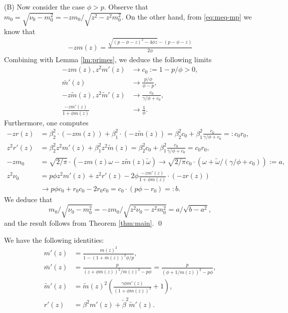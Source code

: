 (B) Now consider the case $\phi>p$. Observe that $m_0 = \sqrt{\nu_0-m_0^2}=-zm_0/\sqrt{z^2-z^2m_0^2}$. On the other hand, from \eqref{eq:meq-mp} we know that
\begin{eqnarray}
    -zm(z) = \frac{\sqrt{(p-\phi-z)^2-4\phi z}-(p-\phi-z)}{2\phi}
\end{eqnarray}
Combining with Lemma \ref{lm:primes}, we deduce the following limits
\begin{align*}
-zm(z),z^2m'(z) &\to c_0:=1-p/\phi>0,\\
\bar m'(z) &\to \frac{p/\phi}{\phi-p},\\
-z\tilde m(z), z^2\tilde m'(z) &\to \frac{c_0}{\gamma/\phi+c_0},\\
\frac{-z m'(z)}{1+\phi m(z)} &\to \frac{1}{\phi}.
\end{align*}
Furthermore, one computes
\begin{align*}
-zr(z) &= \beta_2^2\cdot (-z m(z)) + \beta_1^2\cdot (-z \tilde m(z)) = \beta_2^2c_0 + \beta_1^2 \frac{c_0}{\gamma/\phi+c_0}=:c_0r_0,\\
z^2 r'(z) &= \beta_2^2 z^2m'(z) + \beta_1^2 z^2\tilde m(z) = \beta_2^2 c_0 + \beta_1^2 \frac{c_0}{\gamma/\phi+c_0}=c_0r_0,\\
-zm_0 &= \sqrt{2/\pi}\cdot (-zm(z)\omega-z\tilde m(z)\tilde \omega) \to \sqrt{2/\pi}c_0\cdot(\omega+\tilde\omega/(\gamma/\phi+c_0)):=a,\\
    z^2\nu_0 &= p\phi z^2 m'(z) + z^2r'(z)-2\phi\frac{-zm'(z)}{1+\phi m(z)}\cdot (-z r(z)) \\
    &\to p\phi c_0 + r_0c_0-2r_0c_0=c_0\cdot( p\phi - r_0)=:b.
\end{align*}
 We deduce that
$$
m_0/\sqrt{\nu_0-m_0^2}=-zm_0/\sqrt{z^2\nu_0-z^2m_0^2} = a/\sqrt{b-a^2},
$$
and the result follows from Theorem \ref{thm:main}.
\qed

\begin{lemma}
\label{lm:primes}
    We have the following identities:
    \begin{align*}
        m'(z) &= 
        \frac{m(z)^2}{1-(1+\bar m(z))^2\phi/p},\\
        \bar m'(z) &= \frac{p}{(z+\phi \bar m(z))^2/\bar m(z)^2-p\phi} = \frac{p}{(\phi+1/m(z))^2-p\phi}, \\
        \tilde m'(z) &= \tilde m(z)^2\left(\frac{\gamma\phi m'(z)}{(1+\phi m(z))^2} + 1\right),\\
        r'(z) &= \beta ^2 m'(z) + \tilde \beta ^2 \tilde m'(z).
    \end{align*}
\end{lemma}
